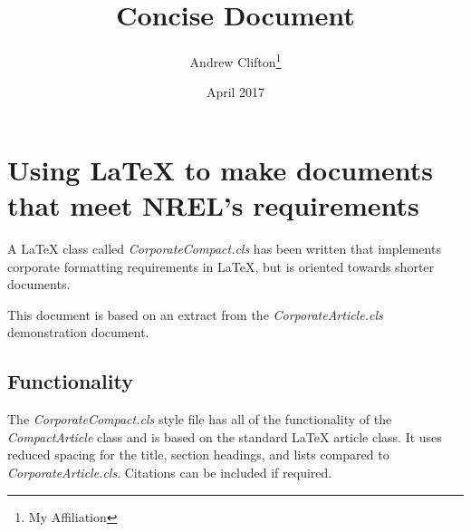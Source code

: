 \documentclass[draft,twocolumn]{CorporateCompact}
\title{Concise Document}
\author{Andrew Clifton\thanks{My Affiliation}}
\date{April 2017}
\begin{document}
\maketitle

\section{Using LaTeX to make documents that meet NREL's requirements}

A LaTeX class called \emph{CorporateCompact.cls} has been written that implements corporate formatting requirements in LaTeX, but is oriented towards shorter documents.

This document is based on an extract from the \emph{CorporateArticle.cls} demonstration document.

\subsection{Functionality}
The \emph{CorporateCompact.cls} style file has all of the functionality of the \emph{CompactArticle} class and is based on the standard LaTeX article class. It uses reduced spacing for the title, section headings, and lists compared to \emph{CorporateArticle.cls}. Citations can be included if required.

\label{sec:Bib}
\printbibliography
\end{document}

